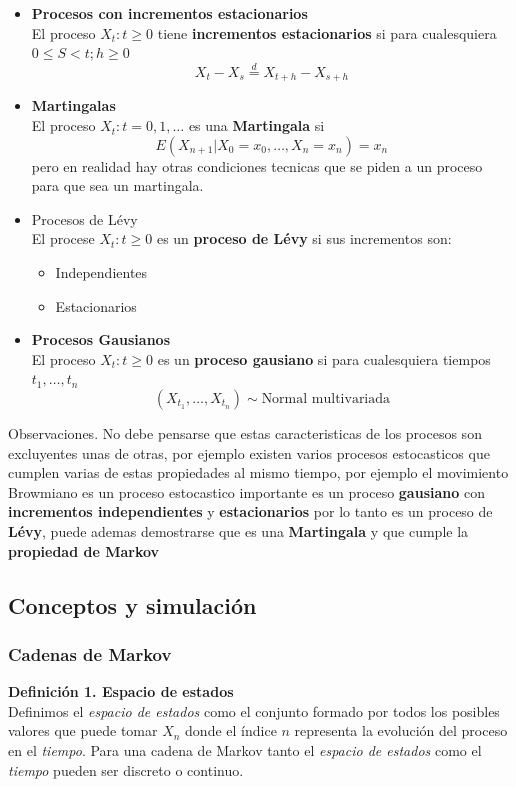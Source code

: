 \documentclass{article}
\theoremstyle{definition}
\theoremstyle{remark}
\begin{document}
\begin{itemize}
	\item \textbf{Procesos con incrementos estacionarios}\\
	El proceso ${X_t : t \geq 0}$ tiene \textbf{incrementos estacionarios} si para cualesquiera $0\leq S < t; h \geq 0 $ $$X_t - X_s \stackrel{d}{=} X_{t+h} - X_{s+h} $$
	\item \textbf{Martingalas} \\
	El proceso ${X_t : t = 0,1,\dots}$ es una \textbf{Martingala} si $$E(X_{n+1}|X_0=x_0,\dots,X_n=x_n)=x_n$$ pero en realidad hay otras condiciones tecnicas que se piden a un proceso para que sea un martingala.\\
	\item Procesos de Lévy \\
	El procese ${X_t: t\geq0}$ es un \textbf{proceso de Lévy} si sus incrementos son:
	\begin{itemize}
		\item Independientes
		\item Estacionarios
	\end{itemize}
	\item \textbf{Procesos Gausianos}\\
	El proceso $X_t: t\geq 0$ es un \textbf{proceso gausiano} si para cualesquiera tiempos $t_1,\dots,t_n$ 
	$$(X_{t_1},\dots,X_{t_n}) \sim \mbox{Normal multivariada}$$
\end{itemize}

Observaciones. No debe pensarse que estas caracteristicas de los procesos son excluyentes unas de otras, por ejemplo existen varios procesos estocasticos que cumplen varias de estas propiedades al mismo tiempo, por ejemplo el movimiento Browmiano es un proceso estocastico importante es un proceso \textbf{gausiano} con \textbf{incrementos independientes} y \textbf{estacionarios} por lo tanto es un proceso de \textbf{Lévy}, puede ademas demostrarse que es una \textbf{Martingala} y  que cumple la \textbf{propiedad de Markov}

\subsection{Conceptos y simulación}
\subsubsection{Cadenas de Markov}
\textbf{Definición 1. Espacio de estados}\\
Definimos el \textit{espacio de estados} como el conjunto formado por todos los posibles valores que puede tomar $X_{n}$ donde el índice $n$ representa la evolución del proceso en el \textit{tiempo}. Para una cadena de Markov tanto el \textit{espacio de estados} como el \textit{tiempo} pueden ser discreto o continuo.\\
\end{document}
